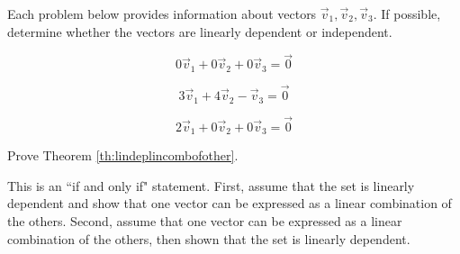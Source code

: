 \documentclass{ximera}
\begin{document}
\begin{problem}
Each problem below provides information about vectors $\vec{v}_1, \vec{v}_2, \vec{v}_3$.  If possible, determine whether the vectors are linearly dependent or independent.

\begin{problem}
$$0\vec{v}_1+ 0\vec{v}_2+ 0\vec{v}_3=\vec{0}$$
\begin{multipleChoice}
 \end{multipleChoice}
\end{problem}

\begin{problem}
$$3\vec{v}_1+ 4\vec{v}_2- \vec{v}_3=\vec{0}$$
\begin{multipleChoice}
 \end{multipleChoice}
\end{problem}

\begin{problem}
$$2\vec{v}_1+ 0\vec{v}_2+ 0\vec{v}_3=\vec{0}$$
\begin{multipleChoice}
 \end{multipleChoice}
\end{problem}

\end{problem}

\begin{problem}\label{prob:lindeplincombofother}
Prove Theorem \ref{th:lindeplincombofother}.
\begin{hint}
This is an ``if and only if" statement.  First, assume that the set is linearly dependent and show that one vector can be expressed as a linear combination of the others.  Second, assume that one vector can be expressed as a linear combination of the others, then shown that the set is linearly dependent.
\end{hint}
\end{problem}
\end{document}
